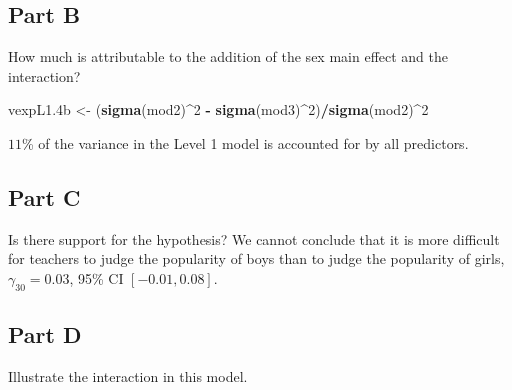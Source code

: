 \documentclass[]{article}
\newenvironment{Shaded}{\begin{snugshade}}{\end{snugshade}}
\newcommand{\KeywordTok}[1]{\textcolor[rgb]{0.13,0.29,0.53}{\textbf{#1}}}
\newcommand{\DecValTok}[1]{\textcolor[rgb]{0.00,0.00,0.81}{#1}}
\newcommand{\StringTok}[1]{\textcolor[rgb]{0.31,0.60,0.02}{#1}}
\newcommand{\OperatorTok}[1]{\textcolor[rgb]{0.81,0.36,0.00}{\textbf{#1}}}
\newcommand{\NormalTok}[1]{#1}
\begin{document}
\subsection{Part B}\label{part-b-3}

How much is attributable to the addition of the sex main effect and the
interaction?

\begin{Shaded}
\begin{Highlighting}[]
\NormalTok{vexpL1.4b <-}\StringTok{ }\NormalTok{(}\KeywordTok{sigma}\NormalTok{(mod2)}\OperatorTok{^}\DecValTok{2} \OperatorTok{-}\StringTok{ }\KeywordTok{sigma}\NormalTok{(mod3)}\OperatorTok{^}\DecValTok{2}\NormalTok{)}\OperatorTok{/}\KeywordTok{sigma}\NormalTok{(mod2)}\OperatorTok{^}\DecValTok{2}
\end{Highlighting}
\end{Shaded}

\(11\)\% of the variance in the Level 1 model is accounted for by all
predictors.

\subsection{Part C}\label{part-c-2}

Is there support for the hypothesis? We cannot conclude that it is more
difficult for teachers to judge the popularity of boys than to judge the
popularity of girls, \(\gamma_{30} = 0.03\), 95\% CI \([-0.01, 0.08]\).

\subsection{Part D}\label{part-d-2}

Illustrate the interaction in this model.
\end{document}
